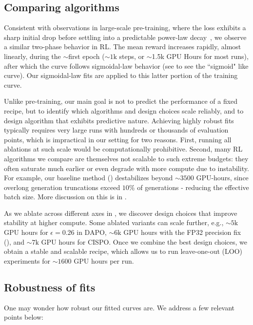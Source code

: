 \documentclass[]{fairmeta} %
\begin{document}
\subsection{Comparing algorithms} \label{appendix:comparing_algos}
Consistent with observations in large-scale pre-training, where the loss exhibits a sharp initial drop before settling into a predictable power-law decay~\citep{misfitting}, we observe a similar two-phase behavior in RL. The mean reward increases rapidly, almost linearly, during the $\sim$first epoch ($\sim 1\text{k}$ steps, or $\sim$1.5k GPU Hours for most runs), after which the curve follows sigmoidal-law behavior (see  to see the ``sigmoid" like curve). Our sigmoidal-law fits are applied to this latter portion of the training curve. 

Unlike pre-training, our main goal is not to predict the performance of a fixed recipe, but to identify which algorithms and design choices scale reliably, and to design algorithm that exhibits predictive nature. Achieving highly robust fits typically requires very large runs with hundreds or thousands of evaluation points, which is impractical in our setting for two reasons. First, running all ablations at such scale would be computationally prohibitive. Second, many RL algorithms we compare are themselves not scalable to such extreme budgets: they often saturate much earlier or even degrade with more compute due to instability. For example, our baseline method () destabilizes beyond $\sim 3500$ GPU-hours, since overlong generation truncations exceed $10\%$ of generations - reducing the effective batch size. More discussion on this is in . 

As we ablate across different axes in , we discover design choices that improve stability at higher compute. Some ablated variants can scale further, e.g., $\sim 5\text{k}$ GPU hours for $\epsilon=0.26$ in DAPO, $\sim 6\text{k}$ GPU hours with the FP32 precision fix (), and $\sim 7\text{k}$ GPU hours for CISPO. Once we combine the best design choices, we obtain a stable and scalable recipe, which allows us to run leave-one-out (LOO) experiments for $\sim 1600$ GPU hours per run.

\subsection{Robustness of fits} \label{appendix:fits_robustness}
One may wonder how robust our fitted curves are. We address a few relevant points below:
\end{document}
